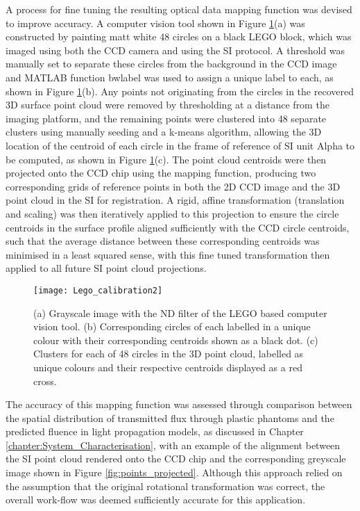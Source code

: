 \documentclass[twoside]{bhamthesis}
\theoremstyle{definition}
\begin{document}
A process for fine tuning the resulting optical data mapping function was devised to improve accuracy. A computer vision tool shown in Figure \ref{fig:Lego_calibration2}(a) was constructed by painting matt white 48 circles on a black LEGO block, which was imaged using both the CCD camera and using the SI protocol. A threshold was manually set to separate these circles from the background in the CCD image and MATLAB function bwlabel was used to assign a unique label to each, as shown in Figure \ref{fig:Lego_calibration2}(b). Any points not originating from the circles in the recovered 3D surface point cloud were removed by thresholding at a distance from the imaging platform, and the remaining points were clustered into 48 separate clusters using manually seeding and a k-means algorithm, allowing the 3D location of the centroid of each circle in the frame of reference of SI unit Alpha to be computed, as shown in Figure \ref{fig:Lego_calibration2}(c). The point cloud centroids were then projected onto the CCD chip using the mapping function,  producing two corresponding grids of reference points in both the 2D CCD image and the 3D point cloud in the SI for registration. A rigid, affine transformation (translation and scaling) was then iteratively applied to this projection to ensure the circle centroids in the surface profile aligned sufficiently with the CCD circle centroids, such that the average distance between these corresponding centroids was minimised in a least squared sense, with this fine tuned transformation then applied to all future SI point cloud projections.

\begin{figure}[!ht]
\texttt{[image: Lego\_calibration2]}
\centering
\caption{(a) Grayscale image with the ND filter of the LEGO based computer vision tool. (b) Corresponding circles of each labelled in a unique colour with their corresponding centroids shown as a black dot. (c) Clusters for each of 48 circles in the 3D point cloud, labelled as unique colours and their respective centroids displayed as a red cross.}
\centering
\label{fig:Lego_calibration2}
\end{figure}

The accuracy of this mapping function was assessed through comparison between the spatial distribution of transmitted flux through plastic phantoms and the predicted fluence in light propagation models, as discussed in Chapter \ref{chapter:System_Characterisation}, with an example of the alignment between the SI point cloud rendered onto the CCD chip and the corresponding greyscale image shown in Figure \ref{fig:points_projected}. Although this approach relied on the assumption that the original rotational transformation was correct, the overall work-flow was deemed sufficiently accurate for this application.
\end{document}

